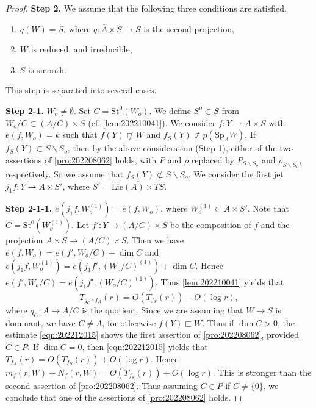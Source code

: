 \documentclass[11pt,english]{smfart}
\theoremstyle{plain}
\theoremstyle{definition}
\theoremstyle{remark}
\numberwithin{equation}{section}
\theoremstyle{plain}
\newcommand{\da}{\rightharpoonup}
\begin{document}
\begin{proof}
		
		
		
		
		
		
		
		
		\textbf{Step 2.}	
		We assume that the following three conditions are satisfied.
		\begin{enumerate}
			\item
			$q(W)=S$, where $q:\overline{A}\times S\to S$ is the second projection,
			\item
			$W$ is reduced, and irreducible,
			\item
			$S$ is smooth.
		\end{enumerate}
		
		
		This step is separated into several cases.
		
		\textbf{Step 2-1.}	
		 $W_o\not=\emptyset$.
		Set $C=\mathrm{St}^0(W_o)$.
		We define $S^o\subset S$ from $W_o/C\subset (A/C)\times S$ (cf. \cref{lem:202210041}).
		We consider $f:Y\da A\times S$ with $e(f,W_o)=k$ such that $f(Y)\not\sqsubset W$ and $f_S(Y)\not\subset p(\mathrm{Sp}_AW)$.
		If $f_S(Y)\subset S\backslash S_o$, then by the above consideration (Step 1), either of the two assertions of \cref{pro:202208062} holds, with $P$ and $\rho$ replaced by $P_{S\backslash S_o}$ and $\rho_{S\backslash S_o}$, respectively.
		So we assume that $f_S(Y)\not\subset S\backslash S_o$.
		We consider the first jet $j_1f:Y\da A\times S'$, where $S'=\overline{\mathrm{Lie}(A)\times TS}$.
		
		\textbf{Step 2-1-1.}	
		 $e(j_1f,W_o^{(1)})=e(f,W_o)$, where $W_o^{(1)}\subset A\times S'$.	
Note that $C=\mathrm{St}^0(W_o^{(1)})$.
		Let $f':Y\to (A/C)\times S$ be the composition of $f$ and the projection $A\times S\to (A/C)\times S$.
		Then we have $e(f,W_o)=e(f',W_o/C)+\dim C$ and $e(j_1f,W_o^{(1)})=e(j_1f',(W_o/C)^{(1)})+\dim C$. 		
		Hence $e(f',W_o/C)=e(j_1f',(W_o/C)^{(1)})$.
		Thus \cref{lem:202210041} yields that 
		\begin{equation}\label{eqn:202212015}
			T_{q_C\circ f_A}(r)=O(T_{f_S}(r))+O(\log r),
		\end{equation}
		where $q_C:A\to A/C$ is the quotient.
		Since we are assuming that $W\to S$ is dominant, we have $C\not=A$, for otherwise $f(Y)\sqsubset W$.
		Thus if $\dim C>0$,  the estimate \eqref{eqn:202212015} shows the first assertion of \cref{pro:202208062}, provided $C\in P$.
		If $\dim C=0$, then \eqref{eqn:202212015} yields that $T_{f_A}(r)= O(T_{f_S}(r))+O(\log r)$.  
		Hence $m_f(r,W)+N_f(r,W)=O(T_{f_S}(r))+O(\log r)$.
		This is stronger than the second assertion of \cref{pro:202208062}.
		Thus assuming $C\in P$ if $C\not= \{0\}$, we conclude that one of the assertions of \cref{pro:202208062} holds.
		

\end{proof}
\end{document}
